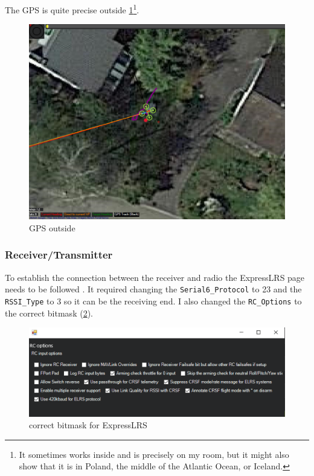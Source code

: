 \documentclass[svgnames]{article}
\begin{document}
	The GPS is quite precise outside \cref{fig:gpsoutside}\footnote{It sometimes works inside and is precisely on my room, but it might also show that it is in Poland, the middle of the Atlantic Ocean, or Iceland.}.
	
\begin{figure}[ht]
	\centering
	\includegraphics[scale=0.2]{pictures/GPS_Outsidewithdot}
	\caption{\gls{GPS} outside}
	\label{fig:gpsoutside}
\end{figure}
	
	

	 
	\subsubsection{Receiver/Transmitter}
	To establish the connection between the receiver and radio the ExpressLRS page needs to be followed \cite{expresslrsorg}. It required changing the \lstinline|Serial6_Protocol| to 23 and the \lstinline|RSSI_Type| to 3 so it can be the receiving end. I also changed the \lstinline|RC_Options| to the correct bitmask (\cref{fig:bitmask}).

\begin{figure}[ht]
	\centering
	\includegraphics[width=0.7\linewidth]{pictures/bitmask}
	\caption{correct bitmask for ExpressLRS}
	\label{fig:bitmask}
\end{figure}
\end{document}
